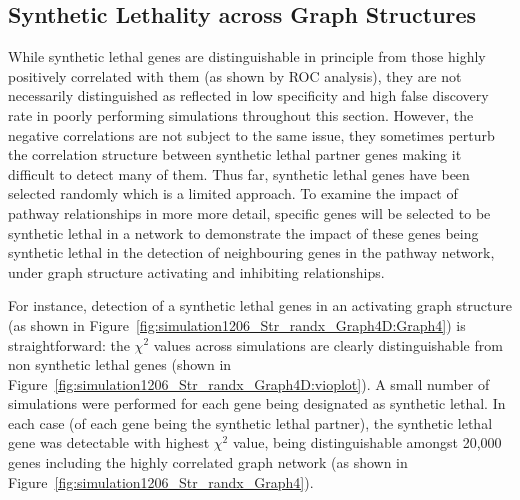 \FloatBarrier

\subsection{Synthetic Lethality across Graph Structures}
\label{chapt5:graphsim_str}

\FloatBarrier

While synthetic lethal genes are distinguishable in principle from those highly positively correlated with them (as shown by \gls{ROC} analysis), they are not necessarily distinguished as reflected in low specificity and high false discovery rate in poorly performing simulations throughout this section. However,  the negative correlations are not subject to the same issue, they sometimes perturb the correlation structure between synthetic lethal partner genes making it difficult to detect many of them. Thus far, synthetic lethal genes have been selected randomly which is a limited approach. To examine the impact of pathway relationships in more more detail, specific genes will be selected to be synthetic lethal in a network to demonstrate the impact of these genes being synthetic lethal in the detection of neighbouring genes in the pathway network, under graph structure activating and inhibiting relationships.

For instance, detection of a synthetic lethal genes in an activating graph structure (as shown in Figure~\ref{fig:simulation1206_Str_randx_Graph4D:Graph4}) is straightforward: the $\chi^2$ values across simulations are clearly distinguishable from non synthetic lethal genes (shown in Figure~\ref{fig:simulation1206_Str_randx_Graph4D:vioplot}). A small number of simulations were performed for each gene being designated as synthetic lethal. In each case (of each gene being the synthetic lethal partner), the synthetic lethal gene was detectable with highest $\chi^2$ value, being distinguishable amongst 20,000 genes including the highly correlated graph network (as shown in Figure~\ref{fig:simulation1206_Str_randx_Graph4}).


